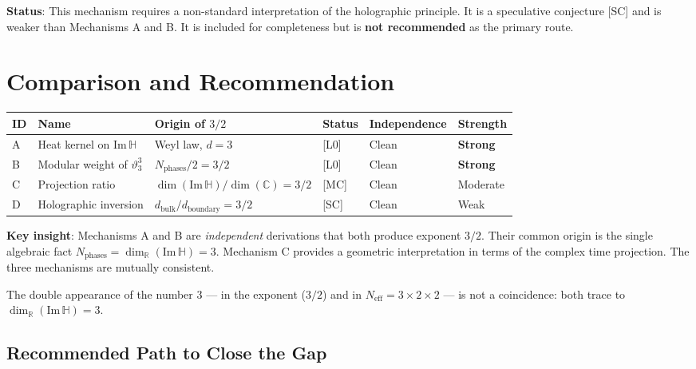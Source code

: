 \documentclass[12pt,a4paper]{article}
\theoremstyle{definition}
\theoremstyle{remark}
\begin{document}
\begin{warnbox}
\textbf{Status}: This mechanism requires a non-standard interpretation of the
holographic principle.  It is a speculative conjecture [SC] and is weaker than
Mechanisms A and B.  It is included for completeness but is \textbf{not recommended}
as the primary route.
\end{warnbox}

\section{Comparison and Recommendation}
\label{sec:exp32:comparison}

\begin{center}
\begin{tabular}{llllll}
\toprule
ID & Name & Origin of $3/2$ & Status & Independence & Strength \\
\midrule
A & Heat kernel on Im$\,\mathbb{H}$ & Weyl law, $d=3$ & [L0] & Clean & \textbf{Strong} \\
B & Modular weight of $\vartheta_3^3$ & $N_\mathrm{phases}/2 = 3/2$ & [L0] & Clean & \textbf{Strong} \\
C & Projection ratio & $\dim(\mathrm{Im}\,\mathbb{H})/\dim(\mathbb{C})=3/2$ & [MC] & Clean & Moderate \\
D & Holographic inversion & $d_\mathrm{bulk}/d_\mathrm{boundary}=3/2$ & [SC] & Clean & Weak \\
\bottomrule
\end{tabular}
\end{center}

\begin{insightbox}
\textbf{Key insight}: Mechanisms A and B are \emph{independent} derivations that
both produce exponent $3/2$.  Their common origin is the single algebraic fact
$N_{\mathrm{phases}} = \dim_\mathbb{R}(\mathrm{Im}\,\mathbb{H}) = 3$.  Mechanism C
provides a geometric interpretation in terms of the complex time projection.
The three mechanisms are mutually consistent.

\medskip
The double appearance of the number $3$ — in the exponent ($3/2$) and in
$N_{\mathrm{eff}} = 3 \times 2 \times 2$ — is not a coincidence: both trace
to $\dim_\mathbb{R}(\mathrm{Im}\,\mathbb{H}) = 3$.
\end{insightbox}

\subsection{Recommended Path to Close the Gap}
\label{ssec:exp32:recommendation}
\end{document}
